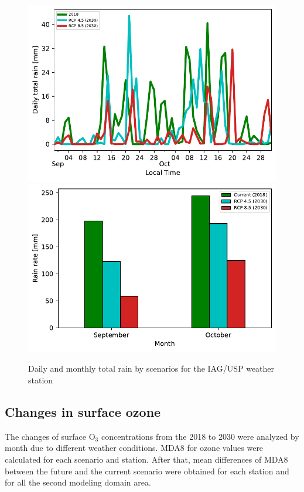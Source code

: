 \begin{figure}[!hbt]
  \centering
  \includegraphics{fig/rain_change_iag.pdf}
  \includegraphics{fig/rain_bymonth.pdf}
  \caption{Daily and monthly total rain by scenarios for the IAG/USP weather station}
  \label{fig:rain_change_iag}
\end{figure}

\subsection{Changes in surface ozone}\label{subsec:res_chan_o3}
The changes of surface O$_3$ concentrations from the 2018 to 2030 were analyzed by month due to different weather conditions. 
MDA8 for ozone values were calculated for each scenario and station. After that, mean differences of MDA8 between the future and the current scenario were obtained for each station and for all the second modeling domain area.

